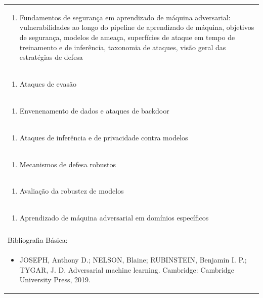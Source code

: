 \documentclass[11pt]{article}
\begin{document}
\begin{center}
\begin{longtable}{|p{4cm}|p{4cm}|p{4cm}|p{4cm}|}
\multicolumn{4}{|p{\dimexpr 16cm + 6\tabcolsep\relax}|}{\begin{enumerate}[start=1]\item Fundamentos de segurança em aprendizado de máquina adversarial: vulnerabilidades ao longo do pipeline de aprendizado de máquina, objetivos de segurança, modelos de ameaça, superfícies de ataque em tempo de treinamento e de inferência, taxonomia de ataques, visão geral das estratégias de defesa\end{enumerate}}\\
\multicolumn{4}{|p{\dimexpr 16cm + 6\tabcolsep\relax}|}{\begin{enumerate}[start=2]\item Ataques de evasão\end{enumerate}}\\
\multicolumn{4}{|p{\dimexpr 16cm + 6\tabcolsep\relax}|}{\begin{enumerate}[start=3]\item Envenenamento de dados e ataques de backdoor\end{enumerate}}\\
\multicolumn{4}{|p{\dimexpr 16cm + 6\tabcolsep\relax}|}{\begin{enumerate}[start=4]\item Ataques de inferência e de privacidade contra modelos\end{enumerate}}\\
\multicolumn{4}{|p{\dimexpr 16cm + 6\tabcolsep\relax}|}{\begin{enumerate}[start=5]\item Mecanismos de defesa robustos\end{enumerate}}\\
\multicolumn{4}{|p{\dimexpr 16cm + 6\tabcolsep\relax}|}{\begin{enumerate}[start=6]\item Avaliação da robustez de modelos\end{enumerate}}\\
\multicolumn{4}{|p{\dimexpr 16cm + 6\tabcolsep\relax}|}{\begin{enumerate}[start=7]\item Aprendizado de máquina adversarial em domínios específicos\end{enumerate}}\\
\multicolumn{4}{|p{\dimexpr 16cm + 6\tabcolsep\relax}|}{}\\
\hline
\multicolumn{4}{|p{16cm}|}{Bibliografia Básica:}\\*
\multicolumn{4}{|p{\dimexpr 16cm + 6\tabcolsep\relax}|}{\begin{itemize}\item JOSEPH, Anthony D.; NELSON, Blaine; RUBINSTEIN, Benjamin I. P.; TYGAR, J. D. Adversarial machine learning. Cambridge: Cambridge University Press, 2019.\end{itemize}}\\

\end{longtable}
\end{center}
\end{document}
